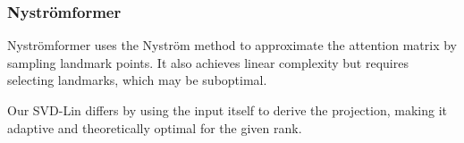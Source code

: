 \subsubsection{Nyströmformer}
Nyströmformer \cite{xiong2021nystromformer} uses the Nyström method to approximate the attention matrix by sampling landmark points. It also achieves linear complexity but requires selecting landmarks, which may be suboptimal.

Our SVD-Lin differs by using the input itself to derive the projection, making it adaptive and theoretically optimal for the given rank.
